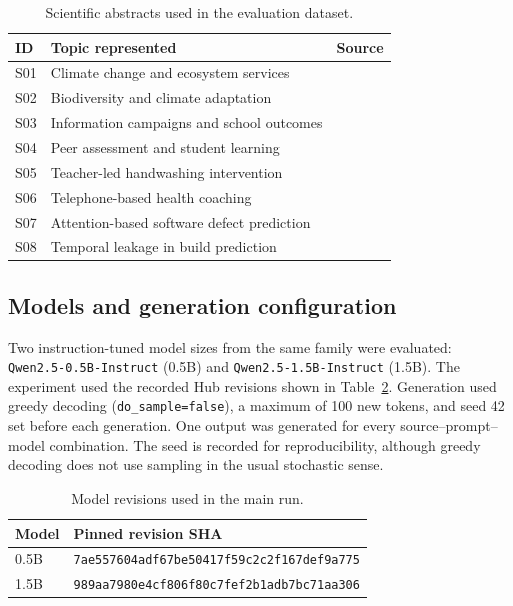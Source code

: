 \documentclass[acmsmall,screen,nonacm]{acmart}
\begin{document}
\begin{table}[t]
\caption{Scientific abstracts used in the evaluation dataset.}
\label{tab:dataset}
\small
\begin{tabularx}{\linewidth}{@{}lXl@{}}
\toprule
ID & Topic represented & Source \\
\midrule
S01 & Climate change and ecosystem services & \cite{delos2025} \\
S02 & Biodiversity and climate adaptation & \cite{jenkins2021} \\
S03 & Information campaigns and school outcomes & \cite{pandey2023} \\
S04 & Peer assessment and student learning & \cite{sun2015} \\
S05 & Teacher-led handwashing intervention & \cite{tidwell2020} \\
S06 & Telephone-based health coaching & \cite{dwinger2020} \\
S07 & Attention-based software defect prediction & \cite{munir2021} \\
S08 & Temporal leakage in build prediction & \cite{mishra2026} \\
\bottomrule
\end{tabularx}
\end{table}

\subsection{Models and generation configuration}
Two instruction-tuned model sizes from the same family were evaluated: \texttt{Qwen2.5-0.5B-Instruct} (0.5B) and \texttt{Qwen2.5-1.5B-Instruct} (1.5B). The experiment used the recorded Hub revisions shown in Table~\ref{tab:models}. Generation used greedy decoding (\texttt{do\_sample=false}), a maximum of 100 new tokens, and seed 42 set before each generation. One output was generated for every source--prompt--model combination. The seed is recorded for reproducibility, although greedy decoding does not use sampling in the usual stochastic sense.

\begin{table}[t]
\caption{Model revisions used in the main run.}
\label{tab:models}
\small
\begin{tabularx}{\linewidth}{@{}lX@{}}
\toprule
Model & Pinned revision SHA \\
\midrule
0.5B & \texttt{7ae557604adf67be}\allowbreak\texttt{50417f59c2c2f167}\allowbreak\texttt{def9a775} \\
1.5B & \texttt{989aa7980e4cf806}\allowbreak\texttt{f80c7fef2b1adb7b}\allowbreak\texttt{c71aa306} \\
\bottomrule
\end{tabularx}
\end{table}
\end{document}
